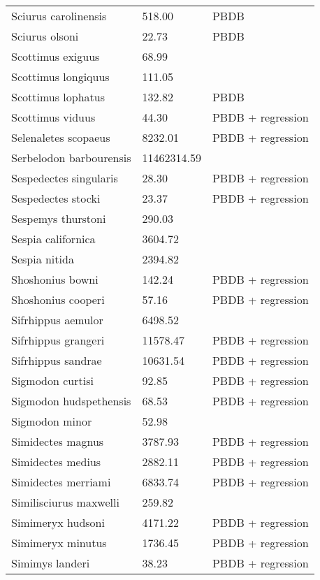 \documentclass{article}
\begin{document}
\begin{center}
\begin{longtable}{p{} p{} p{}}
    Sciurus carolinensis & 518.00 & PBDB \\ 
    Sciurus olsoni & 22.73 & PBDB \\ 
    Scottimus exiguus & 68.99 & \cite{Novacek1977} \\ 
    Scottimus longiquus & 111.05 & \cite{Tomiya2013} \\ 
    Scottimus lophatus & 132.82 & PBDB \\ 
    Scottimus viduus & 44.30 & PBDB + regression \\ 
    Selenaletes scopaeus & 8232.01 & PBDB + regression \\ 
    Serbelodon barbourensis & 11462314.59 & \cite{Secord2008a} \\ 
    Sespedectes singularis & 28.30 & PBDB + regression \\ 
    Sespedectes stocki & 23.37 & PBDB + regression \\ 
    Sespemys thurstoni & 290.03 & \cite{Tomiya2013} \\ 
    Sespia californica & 3604.72 & \cite{Tomiya2013} \\ 
    Sespia nitida & 2394.82 & \cite{VanValkenburgh2007a} \\ 
    Shoshonius bowni & 142.24 & PBDB + regression \\ 
    Shoshonius cooperi & 57.16 & PBDB + regression \\ 
    Sifrhippus aemulor & 6498.52 & \cite{Osborn1933} \\ 
    Sifrhippus grangeri & 11578.47 & PBDB + regression \\ 
    Sifrhippus sandrae & 10631.54 & PBDB + regression \\ 
    Sigmodon curtisi & 92.85 & PBDB + regression \\ 
    Sigmodon hudspethensis & 68.53 & PBDB + regression \\ 
    Sigmodon minor & 52.98 & \cite{Tomiya2013} \\ 
    Simidectes magnus & 3787.93 & PBDB + regression \\ 
    Simidectes medius & 2882.11 & PBDB + regression \\ 
    Simidectes merriami & 6833.74 & PBDB + regression \\ 
    Similisciurus maxwelli & 259.82 & \cite{Tomiya2013} \\ 
    Simimeryx hudsoni & 4171.22 & PBDB + regression \\ 
    Simimeryx minutus & 1736.45 & PBDB + regression \\ 
    Simimys landeri & 38.23 & PBDB + regression \\ 

\end{longtable}
\end{center}
\end{document}
